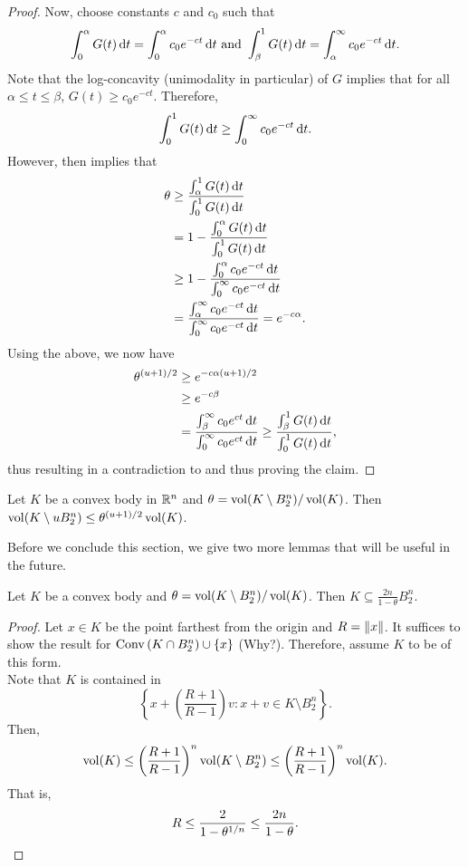 \begin{proof}
	Now, choose constants $c$ and $c_0$ such that
	\[ \int_0^\alpha G(t)\operatorname{d}\!{t} = \int_0^\alpha c_0e^{-ct}\operatorname{d}\!{t} \text{ and } \int_\beta^1 G(t)\operatorname{d}\!{t} = \int_\alpha^\infty c_0e^{-ct}\operatorname{d}\!{t}. \]
	Note that the log-concavity (unimodality in particular) of $G$ implies that for all $\alpha\leq t\leq\beta$, $G(t)\geq c_0e^{-ct}$. Therefore,
	\[ \int_0^1 G(t)\operatorname{d}\!{t} \geq \int_0^\infty c_0e^{-ct}\operatorname{d}\!{t}. \]
	However,  then implies that
	\begin{align*}
		\theta &\geq \frac{\int_\alpha^1 G(t)\d{t}}{\int_0^1 G(t)\d{t}} \\
			&= 1 - \frac{\int_0^\alpha G(t)\d{t}}{\int_0^1 G(t)\d{t}} \\
			&\geq 1 - \frac{\int_0^\alpha c_0e^{-ct}\d{t}}{\int_0^\infty c_0e^{-ct}\d{t}} \\
			&= \frac{\int_\alpha^\infty c_0e^{-ct}\d{t}}{\int_0^\infty c_0e^{-ct}\d{t}} = e^{-c\alpha}.
	\end{align*}
	Using the above, we now have
	\begin{align*}
		\theta^{(u+1)/2} &\geq e^{-c\alpha(u+1)/2} \\
			&\geq e^{-c\beta} \\
			&= \frac{\int_\beta^\infty c_0e^{ct}\operatorname{d}\!{t}}{\int_0^\infty c_0e^{ct}\operatorname{d}\!{t}} \geq \frac{\int_\beta^1 G(t)\operatorname{d}\!{t}}{\int_0^1 G(t)\operatorname{d}\!{t}},
	\end{align*}
	thus resulting in a contradiction to  and thus proving the claim.
\end{proof}


\begin{corollary}
	\label{inequality integral setminus ball restricted to K}
	Let $K$ be a convex body in $\mathbb{R}^n$ and $\theta=\operatorname{vol}(K\setminus B_2^n)/\operatorname{vol}(K)$. Then $\operatorname{vol}(K\setminus uB_2^n)\leq\theta^{(u+1)/2}\operatorname{vol}(K)$.	
\end{corollary}

Before we conclude this section, we give two more lemmas that will be useful in the future.

\begin{lemma}
	\label{lemma 4.38}
	Let $K$ be a convex body and $\theta=\operatorname{vol}(K\setminus B_2^n)/\operatorname{vol}(K)$. Then $K\subseteq \frac{2n}{1-\theta}B_2^n$.
\end{lemma}
\begin{proof}
	Let $x\in K$ be the point farthest from the origin and $R=\left\lVert x\right\rVert$. It suffices to show the result for $\operatorname{Conv}{(K\cap B_2^n)\cup\{x\}}$ (Why?). Therefore, assume $K$ to be of this form.\\
	Note that $K$ is contained in
	\[ \left\{x+\left(\frac{R+1}{R-1}\right) v : x+v\in K\setminus B_2^n\right\}. \]
	Then,
	\[ \operatorname{vol}(K) \leq \left(\frac{R+1}{R-1}\right)^n \operatorname{vol}(K\setminus B_2^n) \leq \left(\frac{R+1}{R-1}\right)^n \operatorname{vol}(K). \]
	That is,
	\[ R \leq \frac{2}{1-\theta^{1/n}} \leq \frac{2n}{1-\theta}.\qedhere \]
\end{proof}

